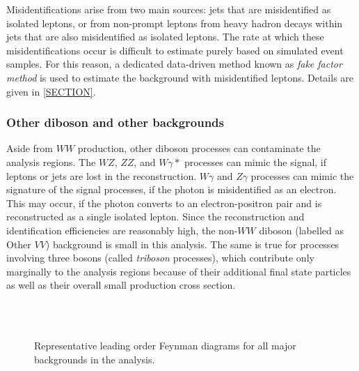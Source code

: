 Misidentifications arise from two main sources: jets that are misidentified as isolated leptons, or from non-prompt leptons from heavy hadron decays within jets that are also misidentified as isolated leptons.
The rate at which these misidentifications occur is difficult to estimate purely based on simulated event samples. For this reason, a dedicated data-driven method known as \emph{fake factor method} is used to estimate the background with misidentified leptons. Details are given in \cref{SECTION}.


\subsubsection{Other diboson and other backgrounds}
Aside from $WW$ production, other diboson processes can contaminate the analysis regions. 
The $WZ$, $ZZ$, and $W\gamma*$ processes can mimic the signal, if leptons or jets are lost in the reconstruction. 
$W\gamma$ and $Z\gamma$ processes can mimic the signature of the signal processes, if the photon is misidentified as an electron. This may occur, if the photon converts to an electron-positron pair and is reconstructed as a single isolated lepton. 
Since the reconstruction and identification efficiencies are reasonably high, the non-$WW$ diboson (labelled as Other $VV$) background is small in this analysis.
The same is true for processes involving three bosons (called \emph{triboson} processes), which contribute only marginally to the analysis regions because of their additional final state particles as well as their overall small production cross section. 


\begin{figure}[t]
     \hspace{5em}
     \\
     \hspace{5em}
     \\
     \hspace{5em}
    \caption{Representative leading order Feynman diagrams for all major backgrounds in the \HWW analysis.} 
    \label{fig:hww:feyn-bkgs}
\end{figure}

